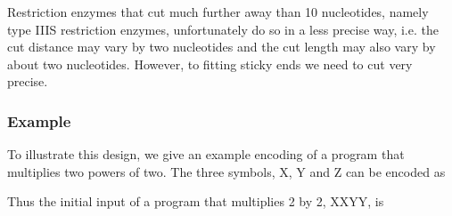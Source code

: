 \documentclass[
11pt, %
a4paper, %
oneside, %
headinclude,footinclude, %
BCOR5mm, %
]{scrartcl}
\begin{document}
Restriction enzymes that cut much further away than 10 nucleotides, namely type
IIIS restriction enzymes, unfortunately do so in a less precise way, i.e. the
cut distance may vary by two nucleotides and the cut length may also vary by
about two nucleotides. However, to fitting sticky ends we need to cut very
precise.

\subsubsection{Example}
To illustrate this design, we give an example encoding of a program that
multiplies two powers of two. The three symbols, X, Y and Z can be encoded as

\begin{center}
\end{center}
Thus the initial input of a program that multiplies 2 by 2, XXYY, is
\end{document}
